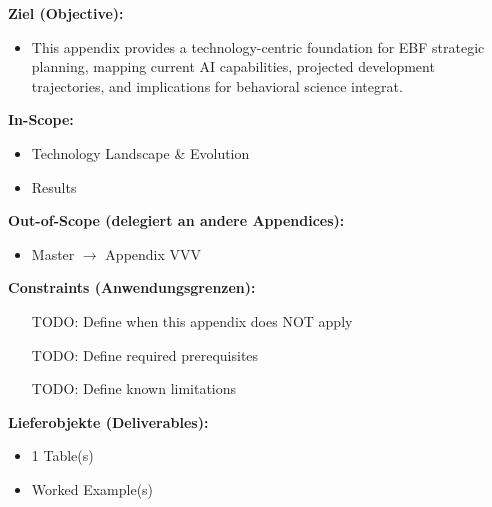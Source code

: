 %
%
%


\begin{tcolorbox}[
    colback=orange!5!white,
    colframe=orange!75!black,
    title={\textbf{Appendix Scope: Ziel / In-Scope / Out-of-Scope / Constraints}},
    fonttitle=\bfseries
]

\textbf{Ziel (Objective):}
\begin{itemize}[nosep]
    \item This appendix provides a technology-centric foundation for EBF strategic planning,
mapping current AI capabilities, projected development trajectories, and
implications for behavioral science integrat.
\end{itemize}

\textbf{In-Scope:}
\begin{itemize}[nosep]
    \item Technology Landscape \& Evolution
    \item Results
\end{itemize}

\textbf{Out-of-Scope (delegiert an andere Appendices):}
\begin{itemize}[nosep]
    \item Master $\rightarrow$ Appendix VVV
\end{itemize}

\textbf{Constraints (Anwendungsgrenzen):}
\begin{itemize}[nosep]
    \item [TODO: Define when this appendix does NOT apply]
    \item [TODO: Define required prerequisites]
    \item [TODO: Define known limitations]
\end{itemize}

\textbf{Lieferobjekte (Deliverables):}
\begin{itemize}[nosep]
    \item 1 Table(s)
    \item Worked Example(s)
\end{itemize}

\end{tcolorbox}



